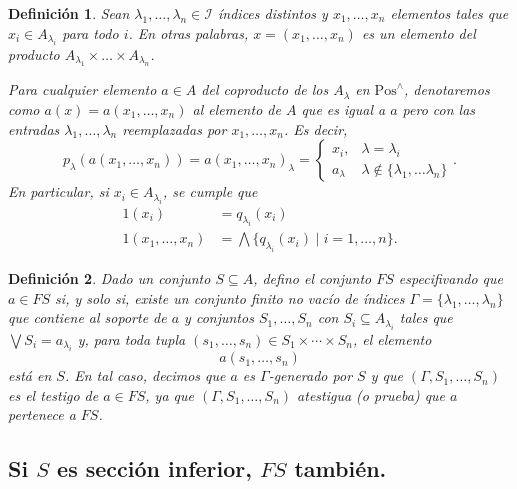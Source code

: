 \documentclass[12pt,letterpaper,titlepage]{article}
\newtheorem*{defn}{Definición}
\theoremstyle{definition}
\newcommand\Sup{\bigvee}
\renewcommand\inf{\wedge}
\newcommand\Inf{\bigwedge}
\newcommand\scr[1]{\mathscr{#1}}
\newcommand\tps[2]{\texorpdfstring{#1}{#2}}
\newcommand\<{\langle}
\renewcommand\>{\rangle}
\newcommand{\Pos}{\mathrm{Pos}}
\begin{document}
\begin{defn}
Sean $\lambda_1,\dots,\lambda_n\in \scr I$ índices distintos y
$x_1,\dots,x_n$ elementos tales que
$x_i\in A_{\lambda_i}$ para todo $i$.
En otras palabras, $x=(x_1,\dots,x_n)$ es un elemento del producto
$A_{\lambda_1}\times\dots\times A_{\lambda_n}$.

Para cualquier elemento $a\in A$ del coproducto de los $A_\lambda$
en $\Pos^\inf$, denotaremos como
$a(x)=a(x_1,\dots,x_n)$ al elemento de $A$ que
es igual a $a$ pero con las entradas $\lambda_1,\dots,\lambda_n$
reemplazadas por $x_1,\dots,x_n$.
Es decir,
\[
    p_\lambda(a(x_1,\dots,x_n))
    =
    a(x_1,\dots,x_n)_\lambda
    =
    \begin{cases}
        x_i, & \lambda = \lambda_i \\
        a_\lambda & \lambda\not\in\{\lambda_1,\dots\lambda_n\}
    \end{cases}
.\]
En particular, si $x_i\in A_{\lambda_i}$, se cumple que
\begin{align*}
  1(x_i)
    &= q_{\lambda_i}(x_i) \\
  1(x_1,\dots,x_n)
    &= \Inf\{q_{\lambda_i}(x_i) \mid i=1,\dots,n\}.
\end{align*}
%
\end{defn}

\begin{defn}
  Dado un conjunto $S\subseteq A$, defino el conjunto $FS$
  especifivando que $a\in FS$ si, y solo si,
  existe un conjunto finito no vacío de índices
  $\Gamma=\{\lambda_1,\dots,\lambda_n\}$ que contiene al
  soporte de $a$ y conjuntos $S_1,\dots,S_n$ con
  $S_i\subseteq A_{\lambda_i}$ tales que $\Sup S_i =
  a_{\lambda_i}$ y, para toda tupla
  $(s_1,\dots,s_n)\in S_1\times\cdots\times S_n$, el elemento
  \[
    a(s_1,\dots,s_n)
  \]
  está en $S$.
  En tal caso, decimos que $a$ es $\Gamma$-generado por $S$ y
  que $(\Gamma,S_1,\dots,S_n)$ es el testigo de $a\in FS$,
  ya que $(\Gamma,S_1,\dots,S_n)$ atestigua (o prueba) que
  $a$ pertenece a $FS$.
\end{defn}

\subsection{Si \tps{$S$}{S} es sección inferior, \tps{$FS$}{FS} también.}
\end{document}
